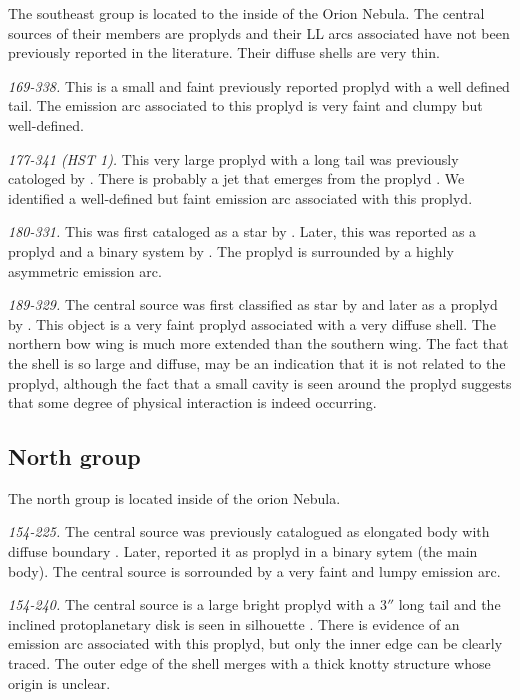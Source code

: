 \documentclass[apj, twocolumn]{aastex63}
\renewcommand\clearpage{}
\begin{document}
The southeast group is located to the inside of the Orion Nebula.
The central sources of their members are proplyds and their LL arcs
associated have not been previously reported in the literature.
Their diffuse shells are very thin. 

\textit{169-338.} This is a small and faint previously reported
proplyd \citep{ODell:1994a, Ricci:2008a} with a well defined tail.
The emission arc associated to this proplyd is very faint and clumpy
but well-defined. 

\textit{177-341 (HST 1).} This very large proplyd with a long tail was
previously catologed by \citet{ODell:1994a, Ricci:2008a}. There is
probably a jet that emerges from the proplyd \citep{Bally:2000a}.
We identified a well-defined but faint  emission arc associated with
this proplyd.

\textit{180-331.} This was first cataloged as a star by
\citet{ODell:1996a}. Later, this was reported as a proplyd and a
binary system by \citet{Ricci:2008a}. The proplyd is surrounded by
a highly asymmetric emission arc.

\textit{189-329.}  The central source was first classified as star
by \citet{ODell:1996a} and later as a proplyd by \citet{Ricci:2008a}.
This object is a very faint proplyd associated with a very diffuse
shell. The northern bow wing is much more extended than the southern
wing. The fact that the shell is so large and diffuse, may be an
indication that it is not related to the proplyd, although the fact
that a small cavity is seen  around the proplyd suggests that some
degree of physical interaction is indeed occurring.


\clearpage
\subsection{North group}
\label{sec:n-group}



The north group is located inside of the orion Nebula.


\textit{154-225.} The central source was previously catalogued
as elongated body with diffuse boundary \citep{ODell:1996a}.
Later, \citet{Ricci:2008a} reported it as proplyd in a binary
sytem (the main body). The central source is sorrounded by a
very faint and lumpy emission arc.

\textit{154-240.} The central source is a large bright
proplyd \cite{Bally:2000a, Ricci:2008a} with a \(3''\)
long tail and the inclined protoplanetary disk is seen
in silhouette \citep{Bally:2000a}. There is evidence of
an emission arc associated with this proplyd, but only
the inner edge can be clearly traced. The outer edge of
the shell merges with a thick knotty structure whose origin
is unclear.
\end{document}
